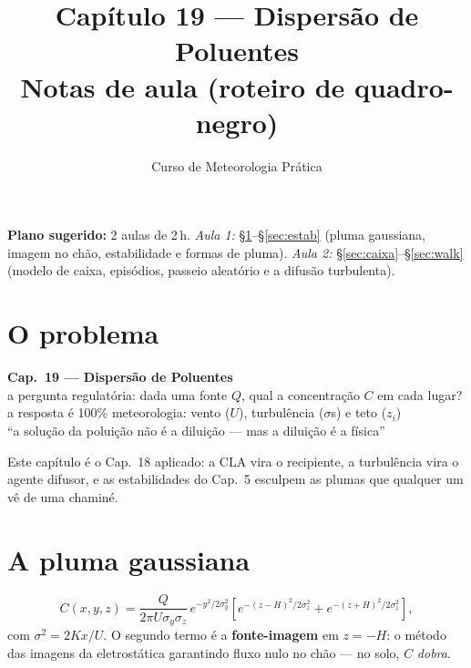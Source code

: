 \documentclass[11pt]{article}
\title{Capítulo 19 --- Dispersão de Poluentes\\
{\large Notas de aula (roteiro de quadro-negro)}}
\author{Curso de Meteorologia Prática}
\date{}
\begin{document}
\maketitle
\thispagestyle{fancy}

\noindent\textbf{Plano sugerido:} 2 aulas de 2\,h.
\emph{Aula 1:} \S\ref{sec:pluma}--\S\ref{sec:estab} (pluma gaussiana,
imagem no chão, estabilidade e formas de pluma).
\emph{Aula 2:} \S\ref{sec:caixa}--\S\ref{sec:walk} (modelo de caixa,
episódios, passeio aleatório e a difusão turbulenta).

\section{O problema}\label{sec:pluma}

\begin{noquadro}[abertura]
\textbf{Cap.~19 --- Dispersão de Poluentes}\\[2pt]
a pergunta regulatória: dada uma fonte $Q$, qual a concentração $C$
em cada lugar?\\
a resposta é 100\% meteorologia: vento ($U$), turbulência
($\sigma$s) e teto ($z_i$)\\[2pt]
``a solução da poluição não é a diluição — mas a diluição é a
física''
\end{noquadro}

Este capítulo é o Cap.~18 aplicado: a CLA  vira o recipiente, a turbulência 
vira o agente difusor, e as estabilidades do Cap.~5
 esculpem as plumas que qualquer
um vê de uma chaminé.

\section{A pluma gaussiana}\label{sec:gauss}


\begin{formadif}
\[ C(x,y,z) = \frac{Q}{2\pi U\sigma_y\sigma_z}\,
e^{-y^2/2\sigma_y^2}\left[e^{-(z-H)^2/2\sigma_z^2} +
e^{-(z+H)^2/2\sigma_z^2}\right], \]
com $\sigma^2 = 2Kx/U$. O segundo termo é a \textbf{fonte-imagem} em
$z = -H$: o método das imagens da eletrostática garantindo fluxo nulo
no chão — no solo, $C$ \emph{dobra}.
\end{formadif}
\end{document}
